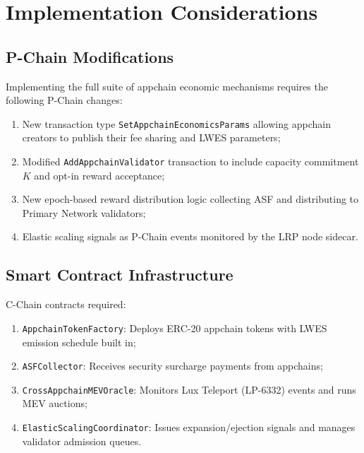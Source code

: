 \section{Implementation Considerations}


\subsection{P-Chain Modifications}

Implementing the full suite of appchain economic mechanisms requires the following P-Chain
changes:

\begin{enumerate}[leftmargin=1.5em]
  \item New transaction type \texttt{SetAppchainEconomicsParams} allowing appchain creators
    to publish their fee sharing and LWES parameters;
  \item Modified \texttt{AddAppchainValidator} transaction to include capacity commitment
    $K$ and opt-in reward acceptance;
  \item New epoch-based reward distribution logic collecting ASF and distributing to
    Primary Network validators;
  \item Elastic scaling signals as P-Chain events monitored by the LRP node sidecar.
\end{enumerate}

\subsection{Smart Contract Infrastructure}

C-Chain contracts required:

\begin{enumerate}[leftmargin=1.5em]
  \item \texttt{AppchainTokenFactory}: Deploys ERC-20 appchain tokens with LWES emission schedule built in;
  \item \texttt{ASFCollector}: Receives security surcharge payments from appchains;
  \item \texttt{CrossAppchainMEVOracle}: Monitors Lux Teleport (LP-6332) events and runs MEV auctions;
  \item \texttt{ElasticScalingCoordinator}: Issues expansion/ejection signals and manages
    validator admission queues.
\end{enumerate}

